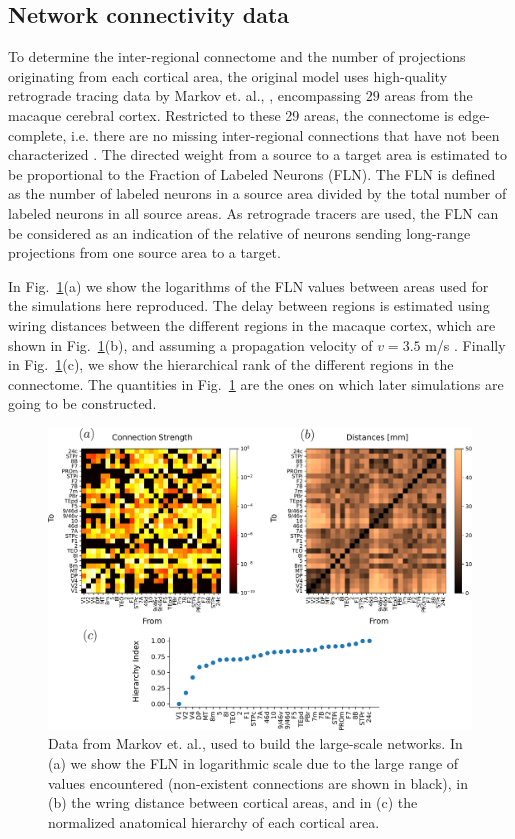 \subsection{Network connectivity data}\label{netowork}

To determine the inter-regional connectome and the number of projections originating from each cortical area, the original model uses high-quality retrograde tracing data by Markov et. al., \cite{markov2014b}, encompassing $29$ areas from the macaque cerebral cortex. Restricted to these 29 areas, the connectome is edge-complete, i.e. there are no missing inter-regional connections that have not been characterized \cite{Markov2013}. The directed weight from a source to a target area is estimated to be proportional to the Fraction of Labeled Neurons (FLN). The FLN is defined as the number of labeled neurons in a source area divided by the total number of labeled neurons in all source areas. As retrograde tracers are used, the FLN can be considered as an indication of the relative of neurons sending long-range projections from one source area to a target.

In Fig.~\ref{fig:fig_data}(a) we show the logarithms of the FLN values between areas used for the simulations here reproduced. The delay between regions is estimated using wiring distances between the different regions in the macaque cortex, which are shown in Fig.~\ref{fig:fig_data}(b), and assuming a propagation velocity of $v=3.5$ m/s \cite{swadlow1990efferent}. Finally in  Fig.~\ref{fig:fig_data}(c), we show the hierarchical rank of the different regions in the connectome. The quantities in Fig.~\ref{fig:fig_data} are the ones on which later simulations are going to be constructed. 

\begin{figure}[!ht]
 \centering
 \includegraphics[scale=0.5]{figures/fig_markov.pdf}
 \caption{Data from Markov et. al., \cite{markov2014b} used to build the large-scale networks. In (a) we show the FLN in logarithmic scale due to the large range of values encountered (non-existent connections are shown in black), in (b) the wring distance between cortical areas, and in (c) the normalized anatomical hierarchy of each cortical area.}\label{fig:fig_data}
\end{figure}

